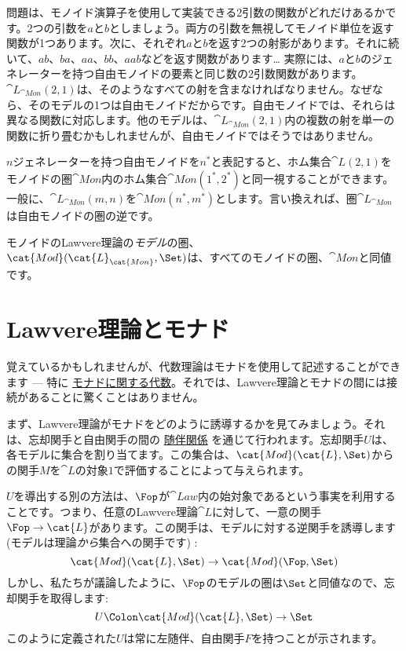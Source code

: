 問題は、モノイド演算子を使用して実装できる2引数の関数がどれだけあるかです。2つの引数を$a$と$b$としましょう。両方の引数を無視してモノイド単位を返す関数が1つあります。次に、それぞれ$a$と$b$を返す2つの射影があります。それに続いて、$ab$、$ba$、$aa$、$bb$、$aab$などを返す関数があります\ldots{} 実際には、$a$と$b$のジェネレーターを持つ自由モノイドの要素と同じ数の2引数関数があります。$\cat{L}_{\cat{Mon}}(2, 1)$は、そのようなすべての射を含まなければなりません。なぜなら、そのモデルの1つは自由モノイドだからです。自由モノイドでは、それらは異なる関数に対応します。他のモデルは、$\cat{L}_{\cat{Mon}}(2, 1)$内の複数の射を単一の関数に折り畳むかもしれませんが、自由モノイドではそうではありません。

$n$ジェネレーターを持つ自由モノイドを$n^*$と表記すると、ホム集合$\cat{L}(2, 1)$をモノイドの圏$\cat{Mon}$内のホム集合$\cat{Mon}(1^*, 2^*)$と同一視することができます。一般に、$\cat{L}_{\cat{Mon}}(m, n)$を$\cat{Mon}(n^*, m^*)$とします。言い換えれば、圏$\cat{L}_{\cat{Mon}}$は自由モノイドの圏の逆です。

モノイドのLawvere理論の\emph{モデル}の圏、\\
$\cat{Mod}(\cat{L}_{\cat{Mon}}, \Set)$は、すべてのモノイドの圏、$\cat{Mon}$と同値です。

\section{Lawvere理論とモナド}

覚えているかもしれませんが、代数理論はモナドを使用して記述することができます --- 特に
\hyperref[algebras-for-monads]{モナドに関する代数}。それでは、Lawvere理論とモナドの間には接続があることに驚くことはありません。

まず、Lawvere理論がモナドをどのように誘導するかを見てみましょう。それは、忘却関手と自由関手の間の
\hyperref[free-forgetful-adjunctions]{随伴関係}
を通じて行われます。忘却関手$U$は、各モデルに集合を割り当てます。この集合は、$\cat{Mod}(\cat{L}, \Set)$からの関手$M$を$\cat{L}$の対象$1$で評価することによって与えられます。

$U$を導出する別の方法は、$\Fop$が$\cat{Law}$内の始対象であるという事実を利用することです。つまり、任意のLawvere理論$\cat{L}$に対して、一意の関手$\Fop \to \cat{L}$があります。この関手は、モデルに対する逆関手を誘導します (モデルは理論\emph{から}集合への関手です) : 
\[\cat{Mod}(\cat{L}, \Set) \to \cat{Mod}(\Fop, \Set)\]
しかし、私たちが議論したように、$\Fop$のモデルの圏は$\Set$と同値なので、忘却関手を取得します: 
\[U \Colon \cat{Mod}(\cat{L}, \Set) \to \Set\]
このように定義された$U$は常に左随伴、自由関手$F$を持つことが示されます。

